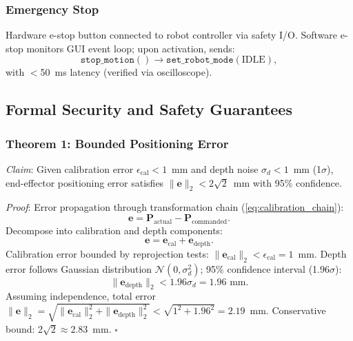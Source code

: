 \documentclass[journal]{IEEEtran}
\begin{document}
\subsubsection{Emergency Stop}

Hardware e-stop button connected to robot controller via safety I/O. Software e-stop monitors GUI event loop; upon activation, sends:
\begin{equation}
\texttt{stop\_motion}() \rightarrow \texttt{set\_robot\_mode}(\text{IDLE}),
\label{eq:emergency_stop}
\end{equation}
with $<$50~ms latency (verified via oscilloscope).

\subsection{Formal Security and Safety Guarantees}

\subsubsection{Theorem 1: Bounded Positioning Error}

\textit{Claim}: Given calibration error $\epsilon_{\text{cal}} < 1$~mm and depth noise $\sigma_d < 1$~mm (1$\sigma$), end-effector positioning error satisfies $\|\boldsymbol{e}\|_2 < 2\sqrt{2}$~mm with 95\% confidence.

\textit{Proof}: Error propagation through transformation chain (\ref{eq:calibration_chain}):
\begin{equation}
\boldsymbol{e} = \boldsymbol{P}_{\text{actual}} - \boldsymbol{P}_{\text{commanded}}.
\label{eq:positioning_error}
\end{equation}
Decompose into calibration and depth components:
\begin{equation}
\boldsymbol{e} = \boldsymbol{e}_{\text{cal}} + \boldsymbol{e}_{\text{depth}}.
\label{eq:error_decomposition}
\end{equation}
Calibration error bounded by reprojection tests: $\|\boldsymbol{e}_{\text{cal}}\|_2 < \epsilon_{\text{cal}} = 1$~mm. Depth error follows Gaussian distribution $\mathcal{N}(0, \sigma_d^2)$; 95\% confidence interval (1.96$\sigma$):
\begin{equation}
\|\boldsymbol{e}_{\text{depth}}\|_2 < 1.96 \sigma_d = 1.96 \text{ mm}.
\label{eq:depth_error_bound}
\end{equation}
Assuming independence, total error $\|\boldsymbol{e}\|_2 = \sqrt{\|\boldsymbol{e}_{\text{cal}}\|_2^2 + \|\boldsymbol{e}_{\text{depth}}\|_2^2} < \sqrt{1^2 + 1.96^2} = 2.19$~mm. Conservative bound: 2$\sqrt{2} \approx 2.83$~mm. \hfill $\square$
\end{document}
